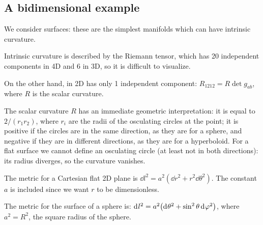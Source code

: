 \documentclass[main.tex]{subfiles}
\begin{document}




\subsection{A bidimensional example}

We consider surfaces: these are the simplest manifolds which can have intrinsic curvature.

\begin{bluebox}
Intrinsic curvature is described by the Riemann tensor, which has 20 independent components in 4D and 6 in 3D, so it is difficult to visualize.

On the other hand, in 2D has only 1 independent component: \(R_{1212} = R \det g_{ab}\), where \(R\) is the scalar curvature. 

The scalar curvature \(R\) has an immediate geometric interpretation: it is equal to \(2/(r_1 r_2)\), where \(r_i\) are the radii of the osculating circles at the point; it is positive if the circles are in the same direction, as they are for a sphere, and negative if they are in different directions, as they are for a hyperboloid.
For a flat surface we cannot define an osculating circle (at least not in both directions): its radius diverges, so the curvature vanishes. 
\end{bluebox}

The metric for a Cartesian flat 2D plane is \(\dd{l^2} = a^2 (\dd{r^2} + r^2 \dd{\theta^2}) \).
The constant \(a\) is included since we want \(r\) to be dimensionless.

The metric for the surface of a sphere is:
\(\dd[]{l^2} = a^2 \qty(\dd[]{\theta^2} + \sin^2 \theta \dd[]{\varphi^2}) \),
where \(a^2 = R^2\), the square radius of the sphere.
\end{document}
